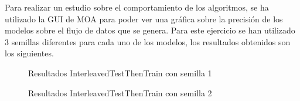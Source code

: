 Para realizar un estudio sobre el comportamiento de los algoritmos, se ha utilizado la GUI de MOA para poder ver una gráfica sobre la precisión de los modelos sobre el flujo de datos que se genera. Para este ejercicio se han utilizado 3 semillas diferentes para cada uno de los modelos, los resultados obtenidos son los siguientes.

\begin{figure}[H]
	\centering
	\caption{Resultados InterleavedTestThenTrain con semilla 1}
	\label{fig:res31}
\end{figure}

\begin{figure}[H]
	\centering
	\caption{Resultados InterleavedTestThenTrain con semilla 2}
	\label{fig:res32}
\end{figure}


